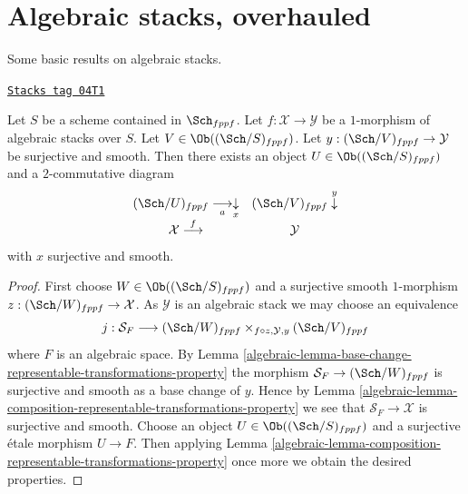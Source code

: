 \section{Algebraic stacks, overhauled}
\label{algebraic-section-overhaul}
Some basic results on algebraic stacks.

\begin{lemma}
\label{algebraic-lemma-lift-morphism-presentations}
\href{https://stacks.math.columbia.edu/tag/04T1}{\texttt{Stacks tag 04T1}}

Let $S$ be a scheme contained in $\Sch_{fppf}$.
Let $f : \mathcal{X} \to \mathcal{Y}$ be a $1$-morphism of algebraic
stacks over $S$.
Let $V \in \Ob((\Sch/S)_{fppf})$.
Let $y : (\Sch/V)_{fppf} \to \mathcal{Y}$ be surjective and smooth.
Then there exists an object $U \in \Ob((\Sch/S)_{fppf})$
and a $2$-commutative diagram
$$
\begin{array}{cc}(\Sch/U)_{fppf} \underset{a}{\longrightarrow}\underset{x}{\downarrow} & (\Sch/V)_{fppf} \overset{y}{\downarrow} \\ \mathcal{X} \overset{f}{\longrightarrow} & \mathcal{Y}\end{array}
$$
with $x$ surjective and smooth.
\end{lemma}

\begin{proof}

First choose $W \in \Ob((\Sch/S)_{fppf})$ and a surjective
smooth $1$-morphism $z : (\Sch/W)_{fppf} \to \mathcal{X}$.
As $\mathcal{Y}$ is an algebraic stack we may choose an equivalence
$$
j :
\mathcal{S}_F
\longrightarrow
(\Sch/W)_{fppf}
\times_{f \circ z, \mathcal{Y}, y}
(\Sch/V)_{fppf}
$$
where $F$ is an algebraic space. By
Lemma \ref{algebraic-lemma-base-change-representable-transformations-property}
the morphism
$\mathcal{S}_F \to (\Sch/W)_{fppf}$ is surjective and smooth
as a base change of $y$. Hence by
Lemma \ref{algebraic-lemma-composition-representable-transformations-property}
we see that $\mathcal{S}_F \to \mathcal{X}$ is surjective and smooth.
Choose an object $U \in \Ob((\Sch/S)_{fppf})$
and a surjective \'etale morphism $U \to F$. Then applying
Lemma \ref{algebraic-lemma-composition-representable-transformations-property}
once more we obtain the desired properties.
\end{proof}

